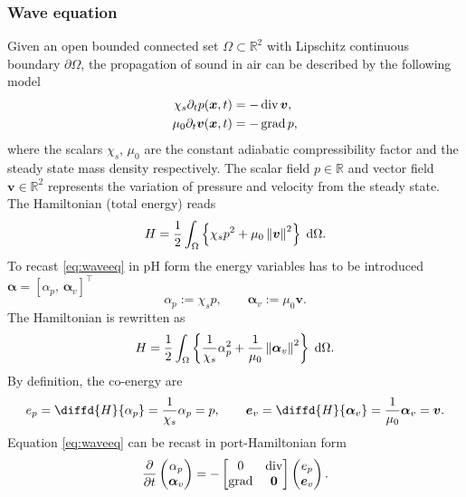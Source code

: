 \subsubsection{Wave equation}\label{sec:waveeq}

Given an open bounded connected set $\Omega \subset \mathbb{R}^2$ with Lipschitz continuous boundary $\partial\Omega$, the propagation of sound in air can be described by the following model \cite{trenchant2018}
\begin{equation}\label{eq:waveeq}
\begin{aligned}
\chi_s \partial_{t} p(\bm{x}, t) &=-\operatorname{div} \bm{v}, \\
\mu_0 \partial_{t} \bm{v}(\bm{x}, t) &= -\operatorname*{grad} p, \\
\end{aligned}
\end{equation}
where the scalars $\chi_s, \, \mu_0$ are the constant adiabatic compressibility factor and the steady state mass density respectively. The scalar field $p \in \mathbb{R}$ and vector field $\bm{v} \in \mathbb{R}^2$ represents the variation of pressure and velocity from the steady state. The Hamiltonian (total energy) reads
\begin{equation*}
H = \frac{1}{2} \int_{\Omega} \left\{\chi_s p^2 + {\mu_0}\norm{\bm{v}}^2 \right\} \d\Omega.
\end{equation*}
To recast \eqref{eq:waveeq} in pH form the energy variables has to be introduced $\bm{\alpha} = [\alpha_p, \, \bm{\alpha}_v]^\top$
\begin{equation*}
\alpha_p := \chi_s p, \qquad \bm{\alpha}_v := \mu_0 \bm{v}.
\end{equation*} 
The Hamiltonian is rewritten as
\begin{equation*}
H = \frac{1}{2} \int_{\Omega} \left\{\frac{1}{\chi_s}\alpha_p^2 + \frac{1}{\mu_0} \norm{\bm{\alpha}_v}^2 \right\} \d\Omega.
\end{equation*}
By definition, the co-energy are 
\begin{equation*}
e_p = \diffd{H}{\alpha_p} = \frac{1}{\chi_s}\alpha_p = p, \qquad \bm{e}_v = \diffd{H}{\bm{\alpha}_v} = \frac{1}{\mu_0} \bm{\alpha}_v = \bm{v}.
\end{equation*}
Equation \eqref{eq:waveeq} can be recast in port-Hamiltonian form
\begin{equation*}
\diffp{}{t}
\begin{pmatrix}
\alpha_p \\
\bm{\alpha}_v \\
\end{pmatrix} = 
-\begin{bmatrix}
0 & \div \\
\grad & \bm{0}
\end{bmatrix}
\begin{pmatrix}
e_p \\
\bm{e}_v \\
\end{pmatrix}.
\end{equation*}
